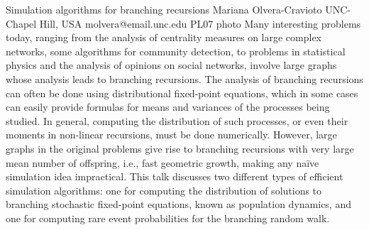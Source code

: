 \documentclass[12pt,a4paper,figuresright]{book}
\begin{document}
\begin{talk}
	{Simulation algorithms for branching recursions}%
	{Mariana Olvera-Cravioto}%
	{UNC-Chapel Hill, USA}%
	{molvera@email.unc.edu}%
	{}%
	{}%
	{}%
	{PL07}%
	{photo}%
	Many interesting problems today, ranging from the analysis of centrality measures on large complex networks, some algorithms for community detection, to problems in statistical physics and the analysis of opinions on social networks, involve large graphs whose analysis leads to branching recursions. The analysis of branching recursions can often be done using distributional fixed-point equations, which in some cases can easily provide formulas for means and variances of the processes being studied. In general, computing the distribution of such processes, or even their moments in non-linear recursions, must be done numerically. However, large graphs in the original problems give rise to branching recursions with very large mean number of offspring, i.e., fast geometric growth, making any naïve simulation idea impractical. This talk discusses two different types of efficient simulation algorithms: one for computing the distribution of solutions to branching stochastic fixed-point equations, known as population dynamics, and one for computing rare event probabilities for the branching random walk.
\end{talk}

\clearpage
\end{document}
